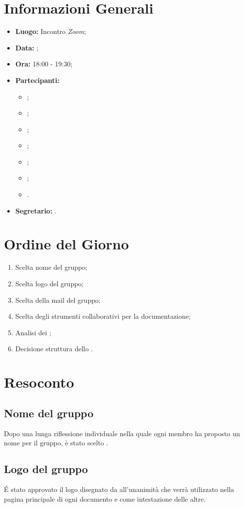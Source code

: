 \section{Informazioni Generali}
\begin{itemize}
\item \textbf{Luogo:} Incontro \textit{Zoom};
\item \textbf{Data:} \Data;
\item \textbf{Ora:} 18:00 - 19:30;
\item \textbf{Partecipanti:}
	\begin{itemize}
		\item \BL{}; 
		\item \FF{};
		\item \MM{}; 
		\item \PC{};
		\item \TG{};
		\item \TL{};
		\item \VD{}.
	\end{itemize} 
\item \textbf{Segretario:} \PC{}.
\end{itemize}

\section{Ordine del Giorno}
\begin{enumerate}
 \item Scelta nome del gruppo;
 \item Scelta logo del gruppo;
 \item Scelta della mail del gruppo;
 \item Scelta degli strumenti collaborativi per la documentazione;
 \item Analisi dei ;
 \item Decisione struttura dello \textit{\SdF}.
\end{enumerate}

\section{Resoconto}
\subsection{Nome del gruppo}
Dopo una lunga riflessione individuale nella quale ogni membro ha proposto un nome per il gruppo, è stato scelto {\Gruppo}.

\subsection{Logo del gruppo}
É stato approvato il logo disegnato da \TG{} all'unanimità che verrà utilizzato nella pagina principale di ogni documento e come intestazione delle altre.

